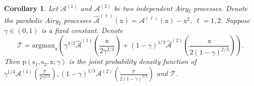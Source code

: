 \documentclass{article}
\newtheorem{cor}[thm]{Corollary}
\numberwithin{equation}{section}
\newcommand{\limp}{\mathrm{p}}
\begin{document}
\begin{cor}
	\label{cor:argmax_Airys}
	Let $\mathcal{A}^{(1)}$ and $\mathcal{A}^{(2)}$ be two independent Airy$_2$ processes. Denote the parabolic Airy$_2$ processes $\mathcal{\hat A}^{(\ell)}(\mathrm{x})=\mathcal{A}^{(\ell)}(\mathrm{x})-\mathrm{x}^2$, $\ell=1,2$. Suppose $\gamma\in(0,1)$ is a fixed constant. Denote
	\begin{equation*}
		\mathcal{T}=\mathrm{argmax}_{\mathrm{x}}\left(\gamma^{1/3}\mathcal{\hat A}^{(1)}\left(\frac{\mathrm{x}}{2\gamma^{2/3}}\right)+(1-\gamma)^{1/3}\mathcal{\hat A}^{(2)}\left(\frac{\mathrm{x}}{2(1-\gamma)^{2/3}}\right)\right).
	\end{equation*}
Then $\limp(\mathrm{s}_1,\mathrm{s}_2,\mathrm{x};\gamma)$ is the joint probability density function of $\gamma^{1/3}\mathcal{ A}^{(1)}\left(\frac{\mathcal{T}}{2\gamma^{2/3}}\right),(1-\gamma)^{1/3}\mathcal{A}^{(2)}\left(\frac{\mathcal{T}}{2(1-\gamma)^{2/3}}\right)$ and $\mathcal{T}$.
\end{cor}
\end{document}

